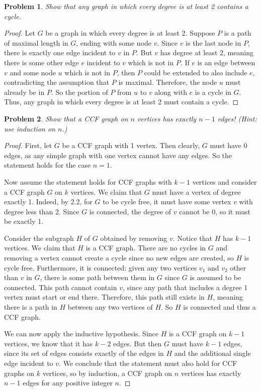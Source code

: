 \documentclass[12pt]{article}
\newtheorem{problem}{Problem}
\begin{document}
\begin{problem}
Show that any graph in which every degree is at least 2 contains a cycle.
\end{problem}

\begin{proof}
Let $G$ be a graph in which every degree is at least 2. Suppose $P$ is a path of maximal length in $G$, ending with some node $v$. Since $v$ is the last node in $P$, there is exactly one edge incident to $v$ in $P$. But $v$ has degree at least 2, meaning there is some other edge $e$ incident to $v$ which is not in $P$. If $e$ is an edge between $v$ and some node $u$ which is not in $P$, then $P$ could be extended to also include $e$, contradicting the assumption that $P$ is maximal. Therefore, the node $u$ must already be in $P$. So the portion of $P$ from $u$ to $v$ along with $e$ is a cycle in $G$. Thus, any graph in which every degree is at least 2 must contain a cycle.
\end{proof}


\begin{problem}
Show that a CCF graph on $n$ vertices has exactly $n-1$ edges! (Hint: use induction on $n$.)
\end{problem}

\begin{proof}
First, let $G$ be a CCF graph with 1 vertex. Then clearly, $G$ must have 0 edges, as any simple graph with one vertex cannot have any edges. So the statement holds for the case $n=1$.

Now assume the statement holds for CCF graphs with $k-1$ vertices and consider a CCF graph $G$ on $k$ vertices. We claim that $G$ must have a vertex of degree exactly 1. Indeed, by 2.2, for $G$ to be cycle free, it must have some vertex $v$ with degree less than 2. Since $G$ is connected, the degree of $v$ cannot be 0, so it must be exactly 1.

Consider the subgraph $H$ of $G$ obtained by removing $v$. Notice that $H$ has $k-1$ vertices. We claim that $H$ is a CCF graph. There are no cycles in $G$ and removing a vertex cannot create a cycle since no new edges are created, so $H$ is cycle free. Furthermore, it is connected: given any two vertices $v_1$ and $v_2$ other than $v$ in $G$, there is some path between them in $G$ since $G$ is assumed to be connected. This path cannot contain $v$, since any path that includes a degree 1 vertex must start or end there. Therefore, this path still exists in $H$, meaning there is a path in $H$ between any two vertices of $H$. So $H$ is connected and thus a CCF graph.

We can now apply the inductive hypothesis. Since $H$ is a CCF graph on $k-1$ vertices, we know that it has $k-2$ edges. But then $G$ must have $k-1$ edges, since its set of edges consists exactly of the edges in $H$ and the additional single edge incident to $v$. We conclude that the statement must also hold for CCF graphs on $k$ vertices, so by induction, a CCF graph on $n$ vertices has exactly $n-1$ edges for any positive integer $n$.
\end{proof}
\end{document}
